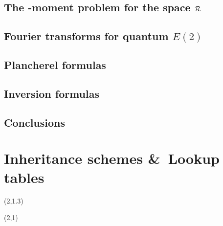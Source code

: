 \documentclass{book}
\begin{document}
\section{The {\protect\qfragile}-moment problem for the space $\mathcal R$}
\label{sec:qHankel:qmoment_problem}

\section{Fourier transforms for quantum $E(2)$}

\section{Plancherel formulas}
\label{sect:plancherel}

\section{Inversion formulas}
\label{sect:inversion}

\section{Conclusions}



\appendix



\chapter{Inheritance schemes \&\ Lookup tables}
\label{app:inheritance}


\newpage
\thispagestyle{empty}
(2,1.3){\scalebox{0.82}{}}

\newpage
\mbox{}
\thispagestyle{empty}
\newpage

\thispagestyle{empty}
(2,1){\scalebox{0.85}{}}



\end{document}
